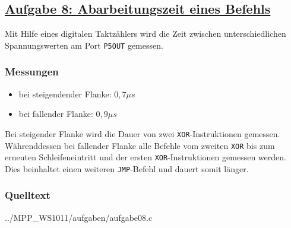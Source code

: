 \subsection
{\href{http://cst.mi.fu-berlin.de/intern/19606-P-MPP/Aufgaben/040204.html}
{Aufgabe 8: Abarbeitungszeit eines Befehls}}

Mit Hilfe eines digitalen Taktzählers wird die Zeit zwischen unterschiedlichen Spannungswerten am Port \texttt{P5OUT} gemessen.
\subsubsection*{Messungen}
\begin{itemize}
    \item bei steigendender Flanke: $0,7 \mu s$
    \item bei fallender Flanke: $0,9 \mu s$
\end{itemize}
Bei steigender Flanke wird die Dauer von zwei \texttt{XOR}-Instruktionen gemessen.
Währenddessen bei fallender Flanke alle Befehle vom zweiten \texttt{XOR} bis zum erneuten Schleifeneintritt und der ersten \texttt{XOR}-Instruktionen gemessen werden. Dies beinhaltet einen weiteren \texttt{JMP}-Befehl und dauert somit länger.
\subsubsection*{Quelltext}


{../MPP_WS1011/aufgaben/aufgabe08.c}
